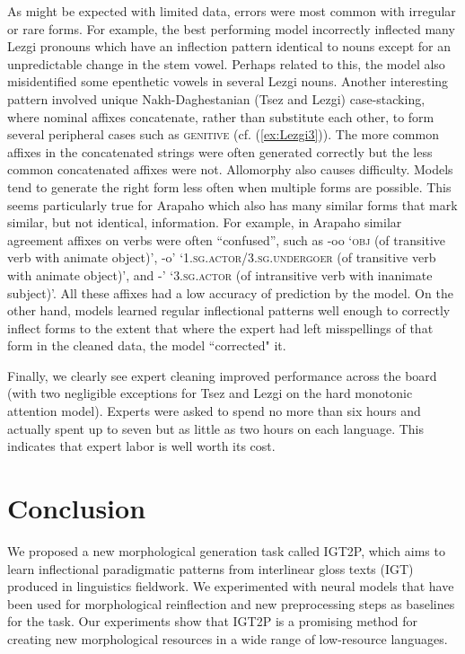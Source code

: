 As might be expected with limited data, errors were most common with irregular or rare forms. For example, the best performing model incorrectly inflected many Lezgi pronouns which have an inflection pattern identical to nouns except for an unpredictable change in the stem vowel. Perhaps related to this, the model also misidentified some epenthetic vowels in several Lezgi nouns. Another interesting pattern involved unique Nakh-Daghestanian (Tsez and Lezgi) case-stacking, where nominal affixes concatenate, rather than substitute each other, to form several peripheral cases such as \textsc{genitive} (cf. (\ref{ex:Lezgi3})). The more common affixes in the concatenated strings were often generated correctly but the less common concatenated affixes were not. Allomorphy also causes difficulty. Models tend to generate the right form less often when multiple forms are possible. This seems particularly true for Arapaho which also has many similar forms that mark similar, but not identical, information. For example, in Arapaho similar agreement affixes on verbs were often ``confused'', such as -oo `\textsc{obj} (of transitive verb with animate object)', -o' `\textsc{1.sg.actor/3.sg.undergoer} (of transitive verb with animate object)', and -' `\textsc{3.sg.actor} (of intransitive verb with inanimate subject)'. All these affixes had a low accuracy of prediction by the model. On the other hand, models learned regular inflectional patterns well enough to correctly inflect forms to the extent that where the expert had left misspellings of that form in the cleaned data, the model ``corrected" it.

Finally, we clearly see expert cleaning improved performance across the board (with two negligible exceptions for Tsez and Lezgi on the hard monotonic attention model). Experts were asked to spend no more than six hours and actually spent up to seven but as little as two hours on each language. This indicates that expert labor is well worth its cost. 


\section{Conclusion}

We proposed a new morphological generation task called IGT2P, which aims to learn inflectional paradigmatic patterns from interlinear gloss texts (IGT) produced in linguistics fieldwork. We experimented with neural models that have been used for morphological reinflection and new preprocessing steps as baselines for the task. Our experiments show that IGT2P is a promising method for creating new morphological resources in a wide range of low-resource languages. 

